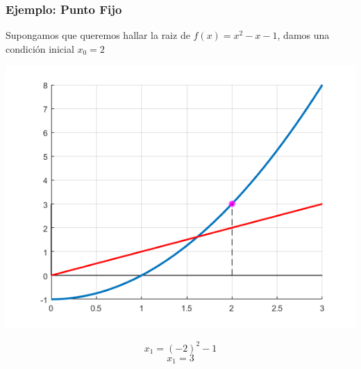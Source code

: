 \documentclass[xcolor=svgnames]{beamer} %
\theoremstyle{plain}
\theoremstyle{definition}
\begin{document}
\begin{frame}
\frametitle{Ejemplo: Punto Fijo}

Supongamos que queremos hallar la raiz de $f(x) = x^2-x-1$,
damos una condición inicial $x_0=2$


\begin{minipage}{.75\linewidth}
\includegraphics[width=\linewidth]{fp_example2/iter1.png} 

\end{minipage} \begin{minipage}{.2\linewidth}
$$ x_1 = (-2)^2-1 $$
$$ x_1 = 3 $$

\end{minipage}
\end{frame}
\end{document}

